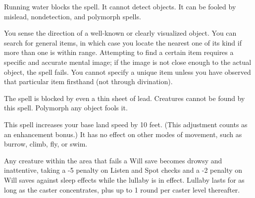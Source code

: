 \begin{multicols}{2}
\begin{small}
\smallskip\noindent Running water blocks the spell. It cannot detect objects. It can be fooled by mislead, nondetection, and polymorph spells.


\noindent You sense the direction of a well-known or clearly visualized object. You can search for general items, in which case you locate the nearest one of its kind if more than one is within range. Attempting to find a certain item requires a specific and accurate mental image; if the image is not close enough to the actual object, the spell fails. You cannot specify a unique item unless you have observed that particular item firsthand (not through divination).

\smallskip\noindent The spell is blocked by even a thin sheet of lead. Creatures cannot be found by this spell. Polymorph any object fools it.


\noindent This spell increases your base land speed by 10 feet. (This adjustment counts as an enhancement bonus.) It has no effect on other modes of movement, such as burrow, climb, fly, or swim.


\noindent Any creature within the area that fails a Will save becomes drowsy and inattentive, taking a -5 penalty on Listen and Spot checks and a -2 penalty on Will saves against sleep effects while the lullaby is in effect. Lullaby lasts for as long as the caster concentrates, plus up to 1 round per caster level thereafter.


\end{small}
\end{multicols}
